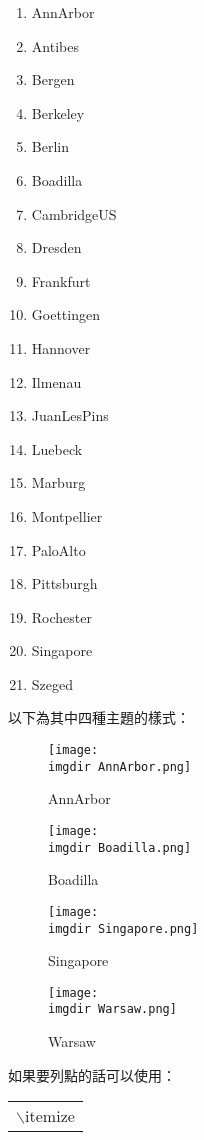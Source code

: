 \documentclass[12pt, a4paper]{article}
\begin{document}
\begin{enumerate}
\item AnnArbor
\item Antibes
\item Bergen
\item Berkeley
\item Berlin
\item Boadilla
\item CambridgeUS
\item Dresden
\item Frankfurt
\item Goettingen
\item Hannover
\item Ilmenau
\item JuanLesPins
\item Luebeck
\item Marburg
\item Montpellier
\item PaloAlto
\item Pittsburgh
\item Rochester
\item Singapore
\item Szeged
\end{enumerate}
以下為其中四種主題的樣式：
\begin{figure}[htbp]
\centering
\begin{minipage}{0.49\linewidth}
\centering
\texttt{[image: \\imgdir AnnArbor.png]}
\caption{AnnArbor}
\label{AnnArbor}
\end{minipage}
\begin{minipage}{0.49\linewidth}
\centering
\texttt{[image: \\imgdir Boadilla.png]}
\caption{Boadilla}
\label{Boadilla}
\end{minipage}
\qquad
\begin{minipage}{0.49\linewidth}
\centering
\texttt{[image: \\imgdir Singapore.png]}
\caption{Singapore}
\label{Singapore}
\end{minipage}
\begin{minipage}{0.49\linewidth}
\centering
\texttt{[image: \\imgdir Warsaw.png]}
\caption{Warsaw}
\label{Warsaw}
\end{minipage}
\end{figure}
如果要列點的話可以使用：
\begin{center}\colorbox{slight}{\begin{tabular}{p{}}
	{$\backslash$itemize}
\end{tabular}}
\end{center}
\end{document}
